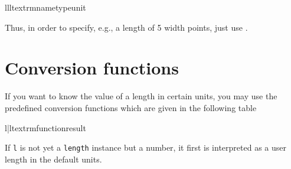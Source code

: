 \medskip
\begin{tableiii}{lll}{textrm}{name}{type}{unit}
\end{tableiii}
\medskip

Thus, in order to specify, e.g., a length of 5 width points, just use
.

\section{Conversion functions}
If you want to know the value of a \PyX{} length in certain units, you
may use the predefined conversion functions which are given in the
following table
\begin{tableii}{l|l}{textrm}{function}{result}
\end{tableii}
If \verb|l| is not yet a \verb|length| instance but a number, it first
is interpreted as a user length in the default units. 



